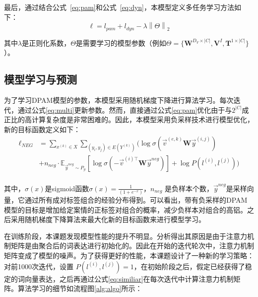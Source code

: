 最后，通过结合公式~\ref{eq:pam}和公式~\ref{eq:dyn}，本模型定义多任务学习方法如下：
\begin{equation}\label{eq:multi}
\ell=l_{pam}+l_{dyn}-\lambda\left\|\Theta\right\|_2
\end{equation}

其中$\lambda$是正则化系数，$\Theta$是需要学习的模型参数（例如$\Theta=\{\textbf{W}^{D_V\times |C|},\textbf{V}^I,\textbf{T}^{1\times|C|}\}$）。

\subsection{模型学习与预测}
为了学习DPAM模型的参数，本模型采用随机梯度下降进行算法学习。每次迭代，通过公式\ref{eq:multi}更新参数。然而，直接通过公式\ref{eq:pam}优化由于与$2^{|C|}$成正比的高计算复杂度是非常困难的。因此，本模型采用负采样技术\cite{mikolov2013}进行模型优化，新的目标函数定义如下：
\begin{displaymath}
\begin{aligned}
\ell_{NEG} &= \sum_{x^{(k)}\in X}\sum_{(y_i,y_j)\in E(Y^{(k)})}\Big( \log\sigma(\vec{v}^{(e,k)}\textbf{W}\vec{y}^{(i,j)})\\
&+n_{neg}\cdot \mathbb{E}_{\vec{y}^{neg}\sim P_{\mathcal{Y}}}[\log\sigma(-\vec{v}^{(i)\top}\textbf{W}\vec{y}^{neg})]+\log P(l^{(i)},l^{(j)})\Big)\\
\end{aligned}
\end{displaymath}

其中，$\sigma(x)$是sigmoid函数$\sigma(x)=\frac{1}{(1+e^{-x})}$，$n_{neg}$ 是负样本个数，$\vec{y}^{neg}$是采样向量，它通过所有成对标签组合的经验分布得到。可以看出，带有负采样的DPAM模型的目标是增加给定案情的正标签对组合的概率，减少负样本对组合的高铝。之后采用随机梯度下降算法来最大化新的目标函数来进行模型学习。

在训练阶段，本课题发现模型性能的提升不明显。分析得出其原因是由于注意力机制矩阵是由聚合后的词表达进行初始化的。因此在开始的迭代轮次中，注意力机制矩阵变成了模型的噪声。为了获得更好的性能，本课题设计了一种新的学习策略：对前1000次迭代，设置
$P(l^{(i)},l^{(j)})=1$，在初始阶段之后，假定已经获得了稳定的词向量表达，之后再通过公式\ref{eq:similiar}在每次迭代中计算注意力机制矩阵。算法学习的细节如流程图\ref{alg:algo}所示：

